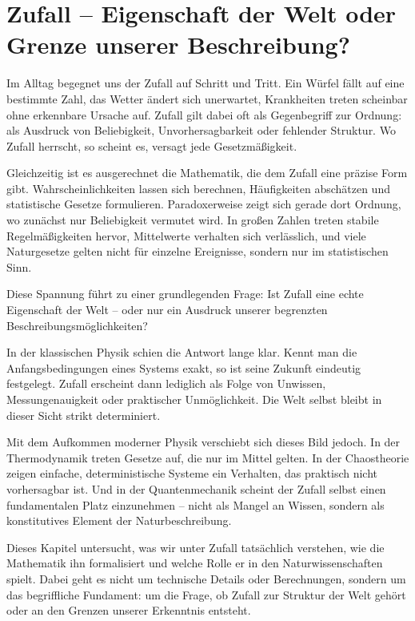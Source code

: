 \chapter[Zufall oder Grenze unserer Beschreibung?]%
{Zufall – Eigenschaft der Welt oder Grenze unserer Beschreibung?}




Im Alltag begegnet uns der Zufall auf Schritt und Tritt.
Ein Würfel fällt auf eine bestimmte Zahl,
das Wetter ändert sich unerwartet,
Krankheiten treten scheinbar ohne erkennbare Ursache auf.
Zufall gilt dabei oft als Gegenbegriff zur Ordnung:
als Ausdruck von Beliebigkeit,
Unvorhersagbarkeit
oder fehlender Struktur.
Wo Zufall herrscht,
so scheint es,
versagt jede Gesetzmäßigkeit.

Gleichzeitig ist es ausgerechnet die Mathematik,
die dem Zufall eine präzise Form gibt.
Wahrscheinlichkeiten lassen sich berechnen,
Häufigkeiten abschätzen
und statistische Gesetze formulieren.
Paradoxerweise zeigt sich gerade dort Ordnung,
wo zunächst nur Beliebigkeit vermutet wird.
In großen Zahlen treten stabile Regelmäßigkeiten hervor,
Mittelwerte verhalten sich verlässlich,
und viele Naturgesetze gelten nicht für einzelne Ereignisse,
sondern nur im statistischen Sinn.

Diese Spannung führt zu einer grundlegenden Frage:
Ist Zufall eine echte Eigenschaft der Welt --
oder nur ein Ausdruck unserer begrenzten Beschreibungsmöglichkeiten?

In der klassischen Physik schien die Antwort lange klar.
Kennt man die Anfangsbedingungen eines Systems exakt,
so ist seine Zukunft eindeutig festgelegt.
Zufall erscheint dann lediglich als Folge von Unwissen,
Messungenauigkeit
oder praktischer Unmöglichkeit.
Die Welt selbst bleibt in dieser Sicht strikt determiniert.

Mit dem Aufkommen moderner Physik verschiebt sich dieses Bild jedoch.
In der Thermodynamik treten Gesetze auf,
die nur im Mittel gelten.
In der Chaostheorie zeigen einfache, deterministische Systeme
ein Verhalten,
das praktisch nicht vorhersagbar ist.
Und in der Quantenmechanik scheint der Zufall selbst
einen fundamentalen Platz einzunehmen --
nicht als Mangel an Wissen,
sondern als konstitutives Element der Naturbeschreibung.

Dieses Kapitel untersucht,
was wir unter \glqq Zufall\grqq{} tatsächlich verstehen,
wie die Mathematik ihn formalisiert
und welche Rolle er in den Naturwissenschaften spielt.
Dabei geht es nicht um technische Details oder Berechnungen,
sondern um das begriffliche Fundament:
um die Frage,
ob Zufall zur Struktur der Welt gehört
oder an den Grenzen unserer Erkenntnis entsteht.

